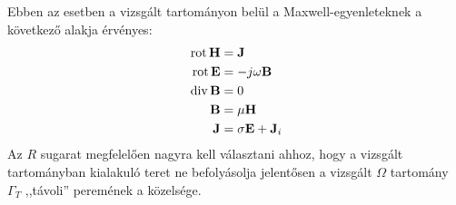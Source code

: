     \clearpage

    Ebben az esetben a vizsgált tartományon belül a Maxwell-egyenleteknek a következő alakja érvényes:
    \begin{align}
        \operatorname{rot} \mathbf{H} &= \mathbf{J} \\
        \operatorname{rot} \mathbf{E} &= -j\omega\mathbf{B}\\
        \operatorname{div} \mathbf{B} &= 0\\
        \mathbf{B} &= \mu\mathbf{H}\\
        \mathbf{J} &= \sigma \mathbf{E} + \mathbf{J}_i
    \end{align}
    Az $R$ sugarat megfelelően nagyra kell választani ahhoz, hogy a vizsgált tartományban kialakuló teret ne befolyásolja jelentősen a vizsgált $\Omega$ tartomány $\Gamma_T$ ,,távoli'' peremének a közelsége.
    
